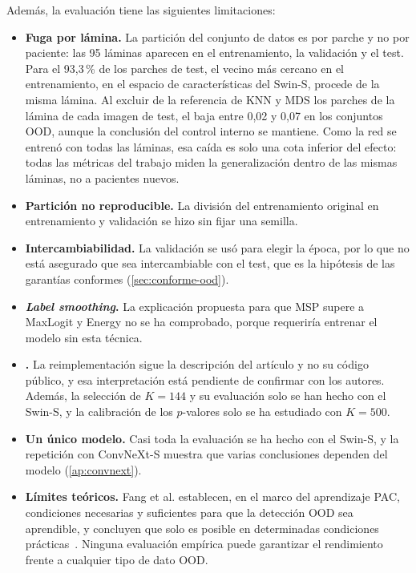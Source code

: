 Además, la evaluación tiene las siguientes limitaciones:
\begin{itemize}
  \item \textbf{Fuga por lámina.} La partición del conjunto de datos es por parche y no por paciente: las 95 láminas aparecen en el entrenamiento, la validación y el test. Para el 93,3\,\% de los parches de test, el vecino más cercano en el entrenamiento, en el espacio de características del Swin-S, procede de la misma lámina. Al excluir de la referencia de KNN y MDS los parches de la lámina de cada imagen de test, el \AUROC baja entre 0,02 y 0,07 en los conjuntos OOD, aunque la conclusión del control interno se mantiene. Como la red se entrenó con todas las láminas, esa caída es solo una cota inferior del efecto: todas las métricas del trabajo miden la generalización dentro de las mismas láminas, no a pacientes nuevos.
  \item \textbf{Partición no reproducible.} La división del entrenamiento original en entrenamiento y validación se hizo sin fijar una semilla.
  \item \textbf{Intercambiabilidad.} La validación se usó para elegir la época, por lo que no está asegurado que sea intercambiable con el test, que es la hipótesis de las garantías conformes (\cref{sec:conforme-ood}).
  \item \textbf{\emph{Label smoothing}.} La explicación propuesta para que MSP supere a MaxLogit y Energy no se ha comprobado, porque requeriría entrenar el modelo sin esta técnica.
  \item \textbf{\stoodx.} La reimplementación sigue la descripción del artículo y no su código público, y esa interpretación está pendiente de confirmar con los autores. Además, la selección de $K = 144$ y su evaluación solo se han hecho con el Swin-S, y la calibración de los $p$-valores solo se ha estudiado con $K = 500$.
  \item \textbf{Un único modelo.} Casi toda la evaluación se ha hecho con el Swin-S, y la repetición con ConvNeXt-S muestra que varias conclusiones dependen del modelo (\cref{ap:convnext}).
  \item \textbf{Límites teóricos.} Fang et al. establecen, en el marco del aprendizaje PAC, condiciones necesarias y suficientes para que la detección OOD sea aprendible, y concluyen que solo es posible en determinadas condiciones prácticas~\cite{yang2024,fang2022}. Ninguna evaluación empírica puede garantizar el rendimiento frente a cualquier tipo de dato OOD.
\end{itemize}

